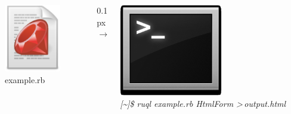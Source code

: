\documentclass{beamer}
\begin{document}
\begin{frame}[allowframebreaks]
  \begin{columns}
    \begin{column}{3cm}
      \includegraphics[width=0.7\textwidth]{img/ruby_file.eps} \\
      \hspace*{0.1cm}
      example.rb
    \end{column}
    \begin{column}{0.1px}
      $\rightarrow$
    \end{column}
    \begin{column}{5cm}
      \hspace*{0.8cm}
      \begin{center}
        \includegraphics[width=0.55\textwidth]{img/terminal_icon.eps} \\
        \tiny{\textit{[\textasciitilde]\$ ruql example.rb HtmlForm \textgreater \,output.html}}

\end{center}
\end{column}
\end{columns}
\end{frame}
\end{document}
